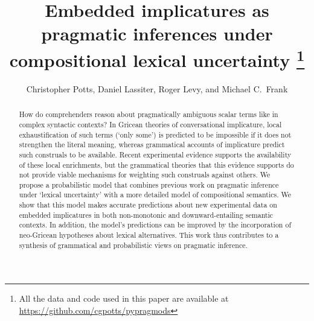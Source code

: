 \documentclass[leqno,12pt]{article}
\begin{document}

\title{Embedded implicatures as pragmatic inferences under compositional lexical uncertainty%
  \thanks{All the data and code used in this paper are available at \url{https://github.com/cgpotts/pypragmods}}}
\author{Christopher Potts, Daniel Lassiter, Roger Levy, and Michael
  C.~Frank}
\maketitle

\vspace{-28pt}

\begin{abstract} 
  How do comprehenders reason about pragmatically ambiguous scalar
  terms like  in complex syntactic contexts?  In Gricean
  theories of conversational implicature, local exhaustification of
  such terms (`only some') is predicted to be impossible if it does
  not strengthen the literal meaning, whereas grammatical accounts of
  implicature predict such construals to be available. Recent
  experimental evidence supports the availability of these local
  enrichments, but the grammatical theories that this evidence
  supports do not provide viable mechanisms for weighting such
  construals against others. We propose a probabilistic model that
  combines previous work on pragmatic inference under `lexical
  uncertainty' with a more detailed model of compositional
  semantics. We show that this model makes accurate predictions about
  new experimental data on embedded implicatures in both non-monotonic
  and downward-entailing semantic contexts. In addition, the model's
  predictions can be improved by the incorporation of neo-Gricean
  hypotheses about lexical alternatives. This work thus contributes to
  a synthesis of grammatical and probabilistic views on pragmatic
  inference.
\end{abstract}

\end{document}
